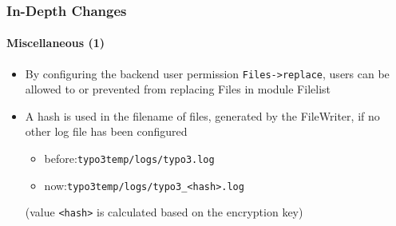 
\begin{frame}[fragile]
	\frametitle{In-Depth Changes}
	\framesubtitle{Miscellaneous (1)}

	\lstset{basicstyle=\tiny\ttfamily}

	\begin{itemize}

		\item By configuring the backend user permission \texttt{Files->replace}, users can be
			allowed to or prevented from replacing Files in module Filelist


		\item A hash is used in the filename of files, generated by the FileWriter,
			if no other log file has been configured

			\begin{itemize}
				\item before:\tabto{1.2cm}\texttt{typo3temp/logs/typo3.log}
				\item now:\tabto{1.2cm}\texttt{typo3temp/logs/typo3\_<hash>.log}
			\end{itemize}

			\small(value \texttt{<hash>} is calculated based on the encryption key)\normalsize


	\end{itemize}

\end{frame}


